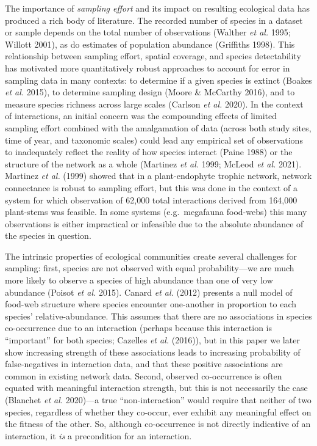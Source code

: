 \documentclass[10pt,oneside]{article}
\begin{document}
The importance of \emph{sampling effort} and its impact on resulting
ecological data has produced a rich body of literature. The recorded
number of species in a dataset or sample depends on the total number of
observations (Walther \emph{et al.} 1995; Willott 2001), as do estimates
of population abundance (Griffiths 1998). This relationship between
sampling effort, spatial coverage, and species detectability has
motivated more quantitatively robust approaches to account for error in
sampling data in many contexts: to determine if a given species is
extinct (Boakes \emph{et al.} 2015), to determine sampling design (Moore
\& McCarthy 2016), and to measure species richness across large scales
(Carlson \emph{et al.} 2020). In the context of interactions, an initial
concern was the compounding effects of limited sampling effort combined
with the amalgamation of data (across both study sites, time of year,
and taxonomic scales) could lead any empirical set of observations to
inadequately reflect the reality of how species interact (Paine 1988) or
the structure of the network as a whole (Martinez \emph{et al.} 1999;
McLeod \emph{et al.} 2021). Martinez \emph{et al.} (1999) showed that in
a plant-endophyte trophic network, network connectance is robust to
sampling effort, but this was done in the context of a system for which
observation of 62,000 total interactions derived from 164,000
plant-stems was feasible. In some systems (e.g.~megafauna food-webs)
this many observations is either impractical or infeasible due to the
absolute abundance of the species in question.

The intrinsic properties of ecological communities create several
challenges for sampling: first, species are not observed with equal
probability---we are much more likely to observe a species of high
abundance than one of very low abundance (Poisot \emph{et al.} 2015).
Canard \emph{et al.} (2012) presents a null model of food-web structure
where species encounter one-another in proportion to each species'
relative-abundance. This assumes that there are no associations in
species co-occurrence due to an interaction (perhaps because this
interaction is ``important'' for both species; Cazelles \emph{et al.}
(2016)), but in this paper we later show increasing strength of these
associations leads to increasing probability of false-negatives in
interaction data, and that these positive associations are common in
existing network data. Second, observed co-occurrence is often equated
with meaningful interaction strength, but this is not necessarily the
case (Blanchet \emph{et al.} 2020)---a true ``non-interaction'' would
require that neither of two species, regardless of whether they
co-occur, ever exhibit any meaningful effect on the fitness of the
other. So, although co-occurrence is not directly indicative of an
interaction, it \emph{is} a precondition for an interaction.
\end{document}
